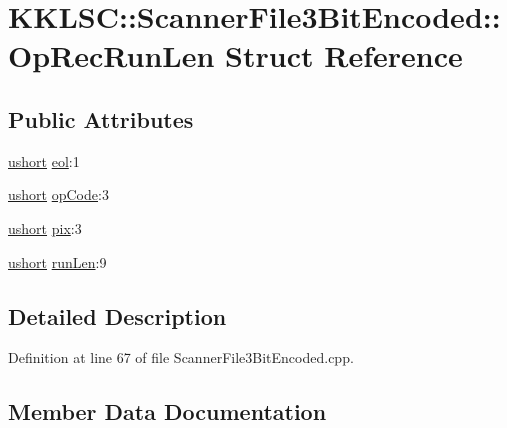 \hypertarget{struct_scanner_file3_bit_encoded_1_1_op_rec_run_len}{}\section{K\+K\+L\+SC\+:\+:Scanner\+File3\+Bit\+Encoded\+:\+:Op\+Rec\+Run\+Len Struct Reference}
\label{struct_scanner_file3_bit_encoded_1_1_op_rec_run_len}
\subsection*{Public Attributes}
\begin{DoxyCompactItemize}
\item 
\hyperlink{namespace_k_k_b_a4a7e2d1bab49f38edf25c38a8dc20012}{ushort} \hyperlink{struct_scanner_file3_bit_encoded_1_1_op_rec_run_len_a243e601ba7e1c263d98b226bfd88b60c}{eol}\+:1
\item 
\hyperlink{namespace_k_k_b_a4a7e2d1bab49f38edf25c38a8dc20012}{ushort} \hyperlink{struct_scanner_file3_bit_encoded_1_1_op_rec_run_len_aa7fa2269190d681438094ca22923e9ec}{op\+Code}\+:3
\item 
\hyperlink{namespace_k_k_b_a4a7e2d1bab49f38edf25c38a8dc20012}{ushort} \hyperlink{struct_scanner_file3_bit_encoded_1_1_op_rec_run_len_a034a8dac6fcbf46981263f58a0998a86}{pix}\+:3
\item 
\hyperlink{namespace_k_k_b_a4a7e2d1bab49f38edf25c38a8dc20012}{ushort} \hyperlink{struct_scanner_file3_bit_encoded_1_1_op_rec_run_len_acd89faea423081d77b449a68c289b8d8}{run\+Len}\+:9
\end{DoxyCompactItemize}


\subsection{Detailed Description}


Definition at line 67 of file Scanner\+File3\+Bit\+Encoded.\+cpp.



\subsection{Member Data Documentation}
